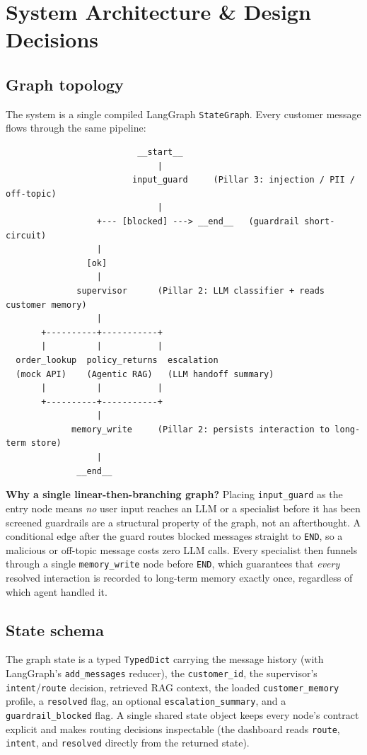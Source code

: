 \documentclass[11pt,a4paper]{article}
\newcommand{\code}[1]{\texttt{#1}}
\begin{document}
\section{System Architecture \& Design Decisions}

\subsection{Graph topology}
The system is a single compiled LangGraph \code{StateGraph}. Every customer message flows through
the same pipeline:

\begin{verbatim}
                          __start__
                              |
                         input_guard     (Pillar 3: injection / PII / off-topic)
                              |
                  +--- [blocked] ---> __end__   (guardrail short-circuit)
                  |
                [ok]
                  |
              supervisor      (Pillar 2: LLM classifier + reads customer memory)
                  |
       +----------+-----------+
       |          |           |
  order_lookup  policy_returns  escalation
  (mock API)    (Agentic RAG)   (LLM handoff summary)
       |          |           |
       +----------+-----------+
                  |
             memory_write     (Pillar 2: persists interaction to long-term store)
                  |
              __end__
\end{verbatim}

\textbf{Why a single linear-then-branching graph?} Placing \code{input\_guard} as the entry node
means \emph{no} user input reaches an LLM or a specialist before it has been screened
\textemdash{} guardrails are a structural property of the graph, not an afterthought. A conditional
edge after the guard routes blocked messages straight to \code{END}, so a malicious or off-topic
message costs zero LLM calls. Every specialist then funnels through a single \code{memory\_write}
node before \code{END}, which guarantees that \emph{every} resolved interaction is recorded to
long-term memory exactly once, regardless of which agent handled it.

\subsection{State schema}
The graph state is a typed \code{TypedDict} carrying the message history (with LangGraph's
\code{add\_messages} reducer), the \code{customer\_id}, the supervisor's \code{intent}/\code{route}
decision, retrieved RAG context, the loaded \code{customer\_memory} profile, a \code{resolved}
flag, an optional \code{escalation\_summary}, and a \code{guardrail\_blocked} flag. A single shared
state object keeps every node's contract explicit and makes routing decisions inspectable (the
dashboard reads \code{route}, \code{intent}, and \code{resolved} directly from the returned state).
\end{document}
